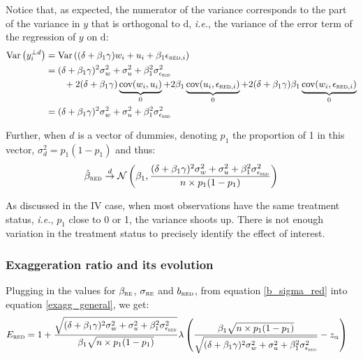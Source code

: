 \documentclass[a4paper, 11pt]{report}
\begin{document}
				Notice that, as expected, the numerator of the variance corresponds to the part of the variance in $y$ that is orthogonal to $\text{d}$, \textit{i.e.}, the variance of the error term of the regression of $y$ on $\text{d}$:
			~
			\begin{align*}
				\text{Var} \left( y_{i}^{\perp d}\right) 
					& = \text{Var} \left( (\delta + \beta_{1}\gamma) w_{i} + u_{i} + \beta_{1} \epsilon_{\textsc{red}, i} \right) \\
					&  = (\delta + \beta_{1}\gamma)^{2} \sigma_{w}^{2} + \sigma_{u}^{2} + \beta_{1}^{2}\sigma_{\epsilon_{\textsc{red}}}^{2}\\
						& \qquad + 2(\delta + \beta_{1}\gamma) \underbrace{\text{cov}(w_{i}, u_{i})}_{0} + 2\beta_{1} \underbrace{\text{cov}(u_{i}, \epsilon_{\textsc{red}, i})}_{0} + 2(\delta + \beta_{1}\gamma) \beta_{1} \underbrace{\text{cov}(w_{i}, \epsilon_{\textsc{red}, i})}_{0}\\
					& = (\delta + \beta_{1}\gamma)^{2} \sigma_{w}^{2} + \sigma_{u}^{2} + \beta_{1}^{2}\sigma_{\epsilon_{\textsc{red}}}^{2}
			\end{align*}
				
				Further, when $d$ is a vector of dummies, denoting $p_{1}$ the proportion of 1 in this vector, $\sigma_{d}^{2} = p_{1}(1 - p_{1})$ and thus:		
				~
				\begin{equation}\label{distrib_red_prop}
						\hat{\beta}_{\textsc{red}} \overset{d}{\to} 
							\mathcal{N}\left(\beta_{1},  \dfrac{(\delta + \beta_{1}\gamma)^{2} \sigma_{w}^{2} + \sigma_{u}^{2} + \beta_{1}^{2}\sigma_{\epsilon_{\textsc{red}}}^{2}}{n \times p_{1}(1-p_{1})}  \right)
				\end{equation}		
				
			As discussed in the IV case, when most observations have the same treatment status, \textit{i.e.}, $p_{1}$ close to 0 or 1, the variance shoots up. There is not enough variation in the treatment status to precisely identify the effect of interest. 
			
			\subsubsection{Exaggeration ratio and its evolution}
			
				Plugging in the values for $\beta_{\textsc{re}}$, $\sigma_{\textsc{re}}$ and $b_{\textsc{red}}$, from equation \ref{b_sigma_red} into equation \ref{exagg_general}, we get:
				~
				\begin{align*}
					E_{\textsc{red}} & = 
					1 + 
					\dfrac{\sqrt{(\delta + \beta_{1}\gamma)^{2} \sigma_{w}^{2} + \sigma_{u}^{2} + \beta_{1}^{2} \sigma_{\epsilon_{\textsc{red}}}^{2}}}{\beta_{1}\sqrt{n \times p_{1}(1-p_{1})}}
					 \lambda \left( \dfrac{\beta_{1}\sqrt{n \times p_{1}(1-p_{1})}}{\sqrt{(\delta + \beta_{1}\gamma)^{2} \sigma_{w}^{2} + \sigma_{u}^{2} + \beta_{1}^{2} \sigma_{\epsilon_{\textsc{red}}}^{2}}} - z_{\alpha} \right)
				\end{align*}
			
\end{document}
